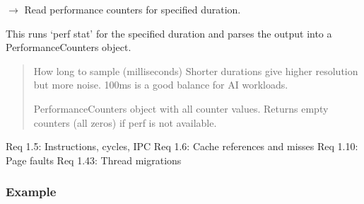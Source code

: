 \documentclass[letterpaper,10pt,english]{sphinxmanual}
\begin{document}
\begin{fulllineitems}

\begin{fulllineitems}
\label{\detokenize{core.readers.perf_reader:core.readers.perf_reader.PerfReader.read_counters}}
\pysigstartsignatures
\pysiglinewithargsret
{}
{}
{{ $\rightarrow$ {\hyperref[\detokenize{core.models.performance_counters:core.models.performance_counters.PerformanceCounters}]{}}}}
\pysigstopsignatures
\sphinxAtStartPar
Read performance counters for specified duration.

\sphinxAtStartPar
This runs ‘perf stat’ for the specified duration and parses
the output into a PerformanceCounters object.
\begin{quote}\begin{description}
\sphinxAtStartPar
{} \textendash{} How long to sample (milliseconds)
Shorter durations give higher resolution but more noise.
100ms is a good balance for AI workloads.

\sphinxAtStartPar
PerformanceCounters object with all counter values.
Returns empty counters (all zeros) if perf is not available.

\end{description}\end{quote}

\sphinxAtStartPar
Req 1.5: Instructions, cycles, IPC
Req 1.6: Cache references and misses
Req 1.10: Page faults
Req 1.43: Thread migrations
\subsubsection*{Example}

\begin{sphinxVerbatim}[commandchars=\\\{\}]
  
  
\end{sphinxVerbatim}


\end{fulllineitems}
\end{fulllineitems}
\end{document}
